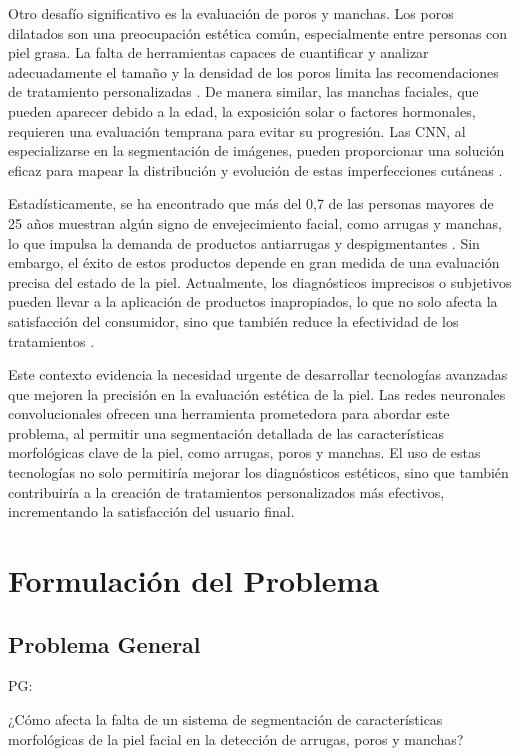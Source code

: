Otro desafío significativo es la evaluación de poros y manchas. Los poros dilatados son una preocupación estética común, especialmente entre personas con piel grasa. La falta de herramientas capaces de cuantificar y analizar adecuadamente el tamaño y la densidad de los poros limita las recomendaciones de tratamiento personalizadas \cite{jia2019}. De manera similar, las manchas faciales, que pueden aparecer debido a la edad, la exposición solar o factores hormonales, requieren una evaluación temprana para evitar su progresión. Las CNN, al especializarse en la segmentación de imágenes, pueden proporcionar una solución eficaz para mapear la distribución y evolución de estas imperfecciones cutáneas \cite{esteva2017}.

Estadísticamente, se ha encontrado que más del 0,7 de las personas mayores de 25 años muestran algún signo de envejecimiento facial, como arrugas y manchas, lo que impulsa la demanda de productos antiarrugas y despigmentantes \cite{aad2022}. Sin embargo, el éxito de estos productos depende en gran medida de una evaluación precisa del estado de la piel. Actualmente, los diagnósticos imprecisos o subjetivos pueden llevar a la aplicación de productos inapropiados, lo que no solo afecta la satisfacción del consumidor, sino que también reduce la efectividad de los tratamientos \cite{khatri2018}.

Este contexto evidencia la necesidad urgente de desarrollar tecnologías avanzadas que mejoren la precisión en la evaluación estética de la piel. Las redes neuronales convolucionales ofrecen una herramienta prometedora para abordar este problema, al permitir una segmentación detallada de las características morfológicas clave de la piel, como arrugas, poros y manchas. El uso de estas tecnologías no solo permitiría mejorar los diagnósticos estéticos, sino que también contribuiría a la creación de tratamientos personalizados más efectivos, incrementando la satisfacción del usuario final.



\section{Formulación del Problema}

\subsection{Problema General}
PG: \newcommand{\ProblemaGeneral}{

¿Cómo afecta la falta de un sistema de segmentación  de características morfológicas de la piel facial en la detección de arrugas, poros y manchas?
}
\ProblemaGeneral
